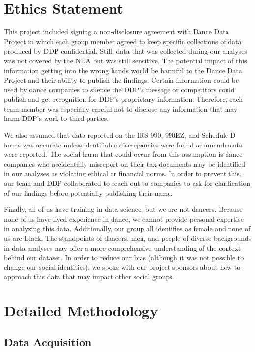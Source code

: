 \documentclass[Dance Data
Project,article,submit,moreauthors,pdftex]{mdpi}
\begin{document}
\hypertarget{ethics-statement}{%
\section{Ethics Statement}\label{ethics-statement}}

This project included signing a non-disclosure agreement with Dance Data
Project in which each group member agreed to keep specific collections
of data produced by DDP confidential. Still, data that was collected
during our analyses was not covered by the NDA but was still sensitive.
The potential impact of this information getting into the wrong hands
would be harmful to the Dance Data Project and their ability to publish
the findings. Certain information could be used by dance companies to
silence the DDP's message or competitors could publish and get
recognition for DDP's proprietary information. Therefore, each team
member was especially careful not to disclose any information that may
harm DDP's work to third parties.

We also assumed that data reported on the IRS 990, 990EZ, and Schedule D
forms was accurate unless identifiable discrepancies were found or
amendments were reported. The social harm that could occur from this
assumption is dance companies who accidentally misreport on their tax
documents may be identified in our analyses as violating ethical or
financial norms. In order to prevent this, our team and DDP collaborated
to reach out to companies to ask for clarification of our findings
before potentially publishing their name.

Finally, all of us have training in data science, but we are not
dancers. Because none of us have lived experience in dance, we cannot
provide personal expertise in analyzing this data. Additionally, our
group all identifies as female and none of us are Black. The standpoints
of dancers, men, and people of diverse backgrounds in data analyses may
offer a more comprehensive understanding of the context behind our
dataset. In order to reduce our bias (although it was not possible to
change our social identities), we spoke with our project sponsors about
how to approach this data that may impact other social groups.

\hypertarget{detailed-methodology}{%
\section{Detailed Methodology}\label{detailed-methodology}}

\hypertarget{data-acquisition}{%
\subsection{Data Acquisition}\label{data-acquisition}}
\end{document}
